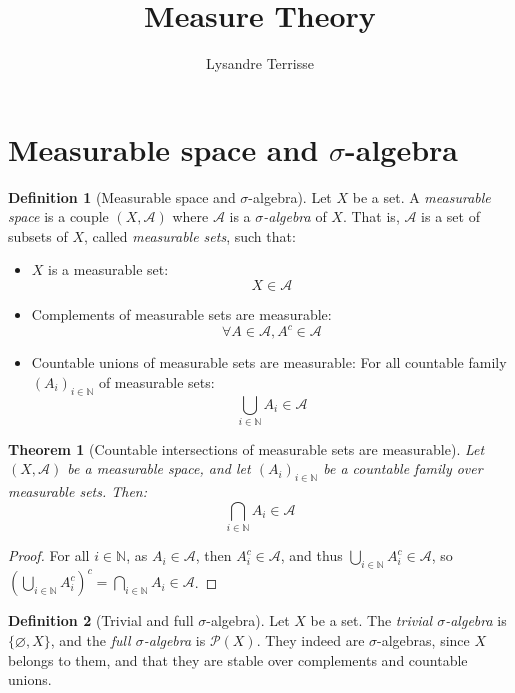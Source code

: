 \documentclass{article}
\title{Measure Theory}
\author{Lysandre Terrisse}
\newtheorem{theorem}{Theorem}[section]
\theoremstyle{definition}
\newtheorem{definition}{Definition}[section]
\theoremstyle{remark}
\theoremstyle{example}
\theoremstyle{notation}
\begin{document}
\maketitle


\section{Measurable space and $\sigma$-algebra}

\begin{definition}[Measurable space and $\sigma$-algebra]
    Let $X$ be a set. A \textit{measurable space} is a couple $(X, \mathcal{A})$ where $\mathcal{A}$ is a \textit{$\sigma$-algebra} of $X$. That is, $\mathcal{A}$ is a set of subsets of $X$, called \textit{measurable sets}, such that:
    \begin{itemize}
        \item $X$ is a measurable set:
            $$X \in \mathcal{A}$$
        \item Complements of measurable sets are measurable:
            $$\forall A \in \mathcal{A}, A^c \in \mathcal{A}$$
        \item Countable unions of measurable sets are measurable: For all countable family $(A_i)_{i \in \mathbb{N}}$ of measurable sets:
            $$\bigcup_{i \in \mathbb{N}} A_i \in \mathcal{A}$$
    \end{itemize}
\end{definition}

\begin{theorem}[Countable intersections of measurable sets are measurable]
    Let $(X, \mathcal{A})$ be a measurable space, and let $(A_i)_{i \in \mathbb{N}}$ be a countable family over measurable sets. Then:
            $$\bigcap_{i \in \mathbb{N}} A_i \in \mathcal{A}$$
\end{theorem}

\begin{proof}
		For all $i \in \mathbb{N}$, as $A_i \in \mathcal{A}$, then $A_i^c \in \mathcal{A}$, and thus $\bigcup_{i \in \mathbb{N}} A_i^c \in \mathcal{A}$, so $\left(\bigcup_{i \in \mathbb{N}} A_i^c\right)^c = \bigcap_{i \in \mathbb{N}} A_i \in \mathcal{A}$.
\end{proof}

\begin{definition}[Trivial and full $\sigma$-algebra]
    Let $X$ be a set. The \textit{trivial $\sigma$-algebra} is $\{\varnothing, X\}$, and the \textit{full $\sigma$-algebra} is $\mathcal{P}(X)$. They indeed are $\sigma$-algebras, since $X$ belongs to them, and that they are stable over complements and countable unions.
\end{definition}
\end{document}
